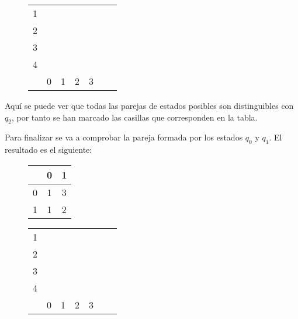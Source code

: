 \documentclass[11pt,a4paper]{article}
\begin{document}
		\begin{figure}[H]
			\centering
			\begin{tabular}{*{7}{c|}}
																							\cline{2-2}
				1 & 																		\\ \cline{2-3}
				2 & \color{red}{X} & \color{red}{X}											\\ \cline{2-4}
				3 & \color{red}{X} & \color{red}{X} &										\\ \cline{2-5}
				4 & \color{blue}{X} & \color{blue}{X} & \color{blue}{X} & \color{blue}{X}	\\ \cline{2-5}
				\multicolumn{0}{c}{} & \multicolumn{1}{c}{0} & \multicolumn{1}{c}{1} & \multicolumn{1}{c}{2}
				& \multicolumn{1}{c}{3}
			\end{tabular}
		\end{figure}
		
		Aquí se puede ver que todas las parejas de estados posibles son distinguibles con $q_2$, por tanto se han marcado
		las casillas que corresponden en la tabla. \par
		
		Para finalizar se va a comprobar la pareja formada por los estados $q_0$ y $q_1$. El resultado es el siguiente:
		
		\begin{figure}[H]
			\centering
			\begin{tabular}{c|cc}
				& 0 & 1		\\ \hline
				0 & 1 & 3	\\
				1 & 1 & 2	\\ \hline				
			\end{tabular}
		\end{figure}
		
		\begin{figure}[H]
			\centering
			\begin{tabular}{*{7}{c|}}
																							\cline{2-2}
				1 & 																		\\ \cline{2-3}
				2 & \color{red}{X} & \color{red}{X}											\\ \cline{2-4}
				3 & \color{red}{X} & \color{red}{X} &										\\ \cline{2-5}
				4 & \color{blue}{X} & \color{blue}{X} & \color{blue}{X} & \color{blue}{X}	\\ \cline{2-5}
				\multicolumn{0}{c}{} & \multicolumn{1}{c}{0} & \multicolumn{1}{c}{1} & \multicolumn{1}{c}{2}
				& \multicolumn{1}{c}{3}
			\end{tabular}
		\end{figure}
		
\end{document}
